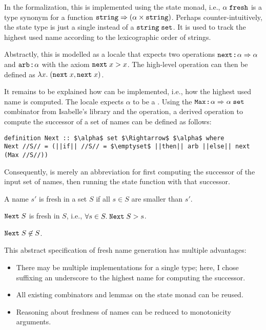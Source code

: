 In the formalization, this is implemented using the state monad, i.e., $\alpha\;\texttt{\textup{fresh}}$ is a type synonym for a function $\texttt{\textup{string}} \Rightarrow (\alpha \times \texttt{\textup{string}})$.
Perhaps counter-intuitively, the state type is just a single  instead of a $\texttt{\textup{string}}\;\texttt{\textup{set}}$.
It is used to track the highest used name according to the lexicographic order of strings.

Abstractly, this is modelled as a locale that expects two operations $\texttt{\textup{next}} \mathbin{:\!\!:} \alpha \Rightarrow \alpha$ and $\texttt{\textup{arb}} \mathbin{:\!\!:} \alpha$ with the axiom $\texttt{\textup{next}}\;x > x$.
The high-level  operation can then be defined as $\lambda x.\;(\texttt{\textup{next}}\;x, \texttt{\textup{next}}\;x)$.

It remains to be explained how  can be implemented, i.e., how the highest used name is computed.
The locale expects $\alpha$ to be a .
Using the $\texttt{\textup{Max}} \mathbin{:\!\!:} \alpha \Rightarrow \alpha\;\texttt{\textup{set}}$ combinator from Isabelle's library and the  operation, a derived operation to compute the successor of a set of names can be defined as follows:
%
\begin{lstlisting}
definition Next :: $\alpha$ set $\Rightarrow$ $\alpha$ where
Next //S// = (||if|| //S// = $\emptyset$ ||then|| arb ||else|| next (Max //S//))
\end{lstlisting}
%
Consequently,  is merely an abbreviation for first computing the successor of the input set of names, then running the state function with that successor.

\begin{definition}[Freshness]
  A name $s'$ is fresh in a set $S$ if all $s \in S$ are smaller than $s'$.
\end{definition}

\begin{lemma}
  $\texttt{\textup{Next}}\;S$ is fresh in $S$, i.e., $\forall s \in S.\; \texttt{\textup{Next}}\;S > s$.
\end{lemma}

\begin{corollary}
  $\texttt{\textup{Next}}\;S \not\in S$.
\end{corollary}

\noindent
This abstract specification of fresh name generation has multiple advantages:
\begin{itemize}
  \item
    There may be multiple implementations for a single type; here, I chose suffixing an underscore to the highest name for computing the successor.
  \item
    All existing combinators and lemmas on the state monad can be reused.
  \item
    Reasoning about freshness of names can be reduced to monotonicity arguments.
\end{itemize}

